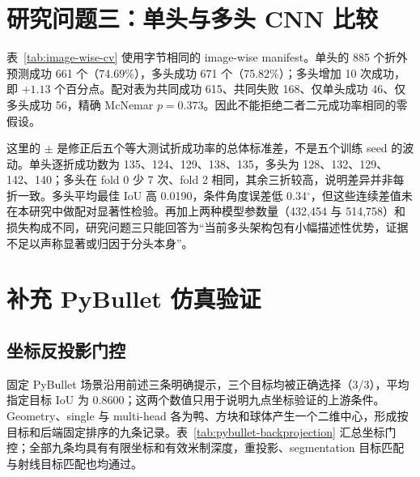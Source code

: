 \documentclass{l4proj}
\begin{document}
\section{研究问题三：单头与多头 CNN 比较}
表~\ref{tab:image-wise-cv} 使用字节相同的 image-wise manifest。单头的 885 个折外预测成功 661 个（74.69\%），多头成功 671 个（75.82\%）；多头增加 10 次成功，即 $+1.13$ 个百分点。配对表为共同成功 615、共同失败 168、仅单头成功 46、仅多头成功 56，精确 McNemar $p=0.373$。因此不能拒绝二者二元成功率相同的零假设。

\begin{table}[htbp]
  \centering
  \caption{Image-wise 五折结果。中心值汇总 885 个折外预测，$\pm$ 为五个等大测试折之间的总体标准差。}
  \label{tab:image-wise-cv}
\end{table}

这里的 $\pm$ 是修正后五个等大测试折成功率的总体标准差，不是五个训练 seed 的波动。单头逐折成功数为 135、124、129、138、135，多头为 128、132、129、142、140；多头在 fold 0 少 7 次、fold 2 相同，其余三折较高，说明差异并非每折一致。多头平均最佳 IoU 高 0.0190，条件角度误差低 0.34$^\circ$，但这些连续差值未在本研究中做配对显著性检验。再加上两种模型参数量（432,454 与 514,758）和损失构成不同，研究问题三只能回答为“当前多头架构包有小幅描述性优势，证据不足以声称显著或归因于分头本身”。

\section{补充 PyBullet 仿真验证}

\subsection{坐标反投影门控}
固定 PyBullet 场景沿用前述三条明确提示，三个目标均被正确选择（3/3），平均指定目标 IoU 为 0.8600；这两个数值只用于说明九点坐标验证的上游条件。Geometry、single 与 multi-head 各为鸭、方块和球体产生一个二维中心，形成按目标和后端固定排序的九条记录。表~\ref{tab:pybullet-backprojection} 汇总坐标门控；全部九条均具有有限坐标和有效米制深度，重投影、segmentation 目标匹配与射线目标匹配也均通过。
\end{document}

